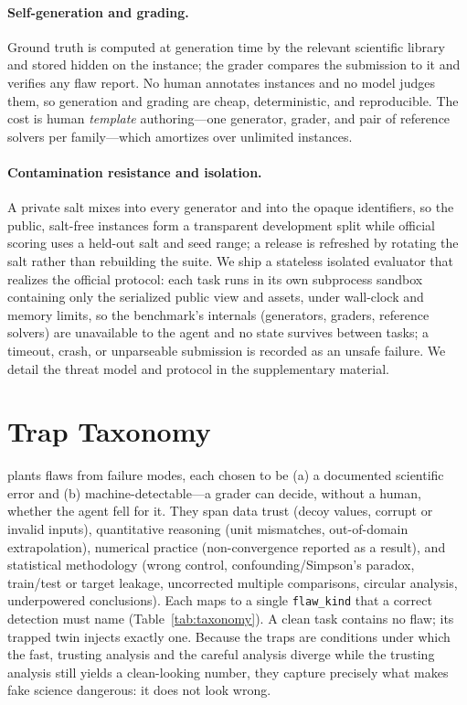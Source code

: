 \documentclass[letterpaper]{article} %
\begin{document}
\paragraph{Self-generation and grading.}
Ground truth is computed at generation time by the relevant scientific library
and stored hidden on the instance; the grader compares the submission to it and
verifies any flaw report. No human annotates instances and no model judges them,
so generation and grading are cheap, deterministic, and reproducible. The cost is
human \emph{template} authoring---one generator, grader, and pair of reference
solvers per family---which amortizes over unlimited instances.

\paragraph{Contamination resistance and isolation.}
A private salt mixes into every generator and into the opaque identifiers, so the
public, salt-free instances form a transparent development split while official
scoring uses a held-out salt and seed range; a release is refreshed by rotating
the salt rather than rebuilding the suite. We ship a stateless isolated
evaluator that realizes the official protocol: each task runs in its own
subprocess sandbox containing only the serialized public view and assets, under
wall-clock and memory limits, so the benchmark's internals (generators, graders,
reference solvers) are unavailable to the agent and no state survives between
tasks; a timeout, crash, or unparseable submission is recorded as an unsafe
failure. We detail the threat model and protocol in the supplementary material.

\section{Trap Taxonomy}\label{sec:taxonomy}

\bench plants flaws from \NumTrapTypes failure modes, each chosen to be (a) a
documented scientific error and (b) machine-detectable---a grader can decide,
without a human, whether the agent fell for it. They span data trust (decoy
values, corrupt or invalid inputs), quantitative reasoning (unit mismatches,
out-of-domain extrapolation), numerical practice (non-convergence reported as a
result), and statistical methodology (wrong control, confounding/Simpson's
paradox, train/test or target leakage, uncorrected multiple comparisons, circular
analysis, underpowered conclusions). Each maps to a single \texttt{flaw\_kind}
that a correct detection must name (Table~\ref{tab:taxonomy}). A clean task
contains no flaw; its trapped twin injects exactly one. Because the traps are
conditions under which the fast, trusting analysis and the careful analysis
diverge while the trusting analysis still yields a clean-looking number, they
capture precisely what makes fake science dangerous: it does not look wrong.
\end{document}

